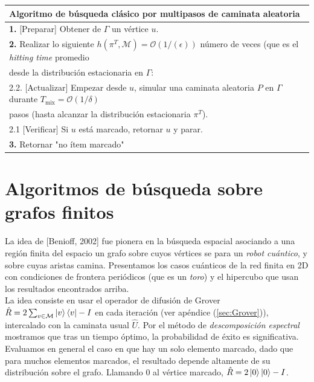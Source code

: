 \begin{center}
    \begin{tabular}{|l|}
    \hline \textbf{Algoritmo de búsqueda clásico} por multipasos de caminata aleatoria\\\hline 
    \textbf{1.} [Preparar] Obtener de $\Gamma$ un vértice $u$.\\
    \textbf{2.} Realizar lo siguiente $h(\pi^T,\mathcal{M})=\mathcal{O}(1/(\epsilon ))$ número de veces (que es el \textit{hitting time} promedio\\ desde la distribución estacionaria en $\Gamma$:\\
    2.2. [Actualizar] Empezar desde $u$, simular una caminata aleatoria $P$ en $\Gamma$ durante $T_{\text{mix}}=\mathcal{O}(1/\delta)$\\ pasos (hasta alcanzar la distribución estacionaria $\pi^T$).\\
    2.1 [Verificar] Si $u$ está marcado, retornar $u$ y  parar. \\
    \textbf{3.} Retornar "no ítem marcado"\\\hline
    \end{tabular}{}
\end{center}{}

\section{Algoritmos de búsqueda sobre grafos  finitos}
La idea de [Benioff, 2002] fue pionera en la  búsqueda espacial asociando a una región finita del espacio un grafo sobre cuyos vértices se para un \textit{robot cuántico}, y sobre cuyas aristas camina. Presentamos los casos cuánticos de la red finita en 2D con condiciones de frontera periódicos (que es un \textit{toro}) y el hipercubo que usan los resultados encontrados arriba.\\

La idea consiste en usar el operador de difusión de Grover $\hat{R}=2\sum_{v\in \mathcal{M}}\ket{v}\bra{v}-I$ en cada iteración (ver apéndice (\ref{sec:Grover})), intercalado con la caminata usual $\hat{U}$. Por el método de \textit{descomposición espectral} mostramos que tras un tiempo óptimo, la probabilidad de éxito es significativa.\\

Evaluamos en general el caso en que hay un solo elemento marcado, dado que para muchos elementos marcados, el resultado depende altamente de su distribución sobre el grafo. Llamando $0$ al vértice marcado, $\hat{R}=2\ket{0}\ket{0}-I$.\\

